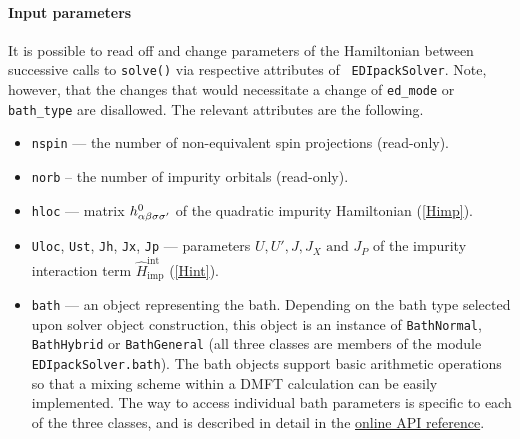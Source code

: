 \documentclass[edipack2.tex]{subfiles}
\begin{document}
\paragraph{{\bf Input parameters}}
It is possible to read off and change parameters of the Hamiltonian between
successive calls to {\tt solve()} via respective attributes of {\tt 
EDIpackSolver}. Note, however, that the changes that would necessitate a change of {\tt ed\_mode} or {\tt bath\_type} are disallowed. The relevant attributes
are the following.
\begin{itemize}
    \item {\tt nspin} --- the number of non-equivalent spin projections 
          (read-only).
    \item {\tt norb} -- the number of impurity orbitals (read-only).
    \item {\tt hloc} --- matrix $h^0_{\alpha\beta\sigma\sigma'}$ of
          the quadratic impurity Hamiltonian (\ref{Himp}).
    \item {\tt Uloc}, {\tt Ust}, {\tt Jh}, {\tt Jx}, {\tt Jp} ---
          parameters $U, U', J, J_X \text{ and } J_P$ of the impurity
          interaction term $\hat{H}^\mathrm{int}_\mathrm{imp}$ (\ref{Hint}).
    \item {\tt bath} --- an object representing the bath. Depending on the
          bath type selected upon solver object construction, this object is an
          instance of {\tt BathNormal}, {\tt BathHybrid} or {\tt BathGeneral}
          (all three classes are members of the module
          {\tt EDIpackSolver.bath}). The bath objects support basic arithmetic
          operations so that a mixing scheme within a DMFT calculation can be
          easily implemented. The way to access individual bath parameters is
          specific to each of the three classes, and is described in detail in the       \href{https://krivenko.github.io/edipack2triqs/documentation.html\#module-edipack2triqs.bath}{online API reference}.
\end{itemize}
\end{document}
